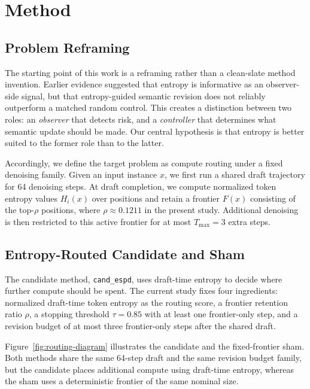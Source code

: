 \documentclass{article}
\begin{document}
\section{Method}

\subsection{Problem Reframing}

The starting point of this work is a reframing rather than a clean-slate method invention. Earlier evidence suggested that entropy is informative as an observer-side signal, but that entropy-guided semantic revision does not reliably outperform a matched random control. This creates a distinction between two roles: an \emph{observer} that detects risk, and a \emph{controller} that determines what semantic update should be made. Our central hypothesis is that entropy is better suited to the former role than to the latter.

Accordingly, we define the target problem as compute routing under a fixed denoising family. Given an input instance $x$, we first run a shared draft trajectory for 64 denoising steps. At draft completion, we compute normalized token entropy values $H_i(x)$ over positions and retain a frontier $F(x)$ consisting of the top-$\rho$ positions, where $\rho \approx 0.1211$ in the present study. Additional denoising is then restricted to this active frontier for at most $T_{\max} = 3$ extra steps.

\subsection{Entropy-Routed Candidate and Sham}

The candidate method, \texttt{cand\_espd}, uses draft-time entropy to decide where further compute should be spent. The current study fixes four ingredients: normalized draft-time token entropy as the routing score, a frontier retention ratio $\rho$, a stopping threshold $\tau = 0.85$ with at least one frontier-only step, and a revision budget of at most three frontier-only steps after the shared draft.

Figure~\ref{fig:routing-diagram} illustrates the candidate and the fixed-frontier sham. Both methods share the same 64-step draft and the same revision budget family, but the candidate places additional compute using draft-time entropy, whereas the sham uses a deterministic frontier of the same nominal size.
\end{document}
